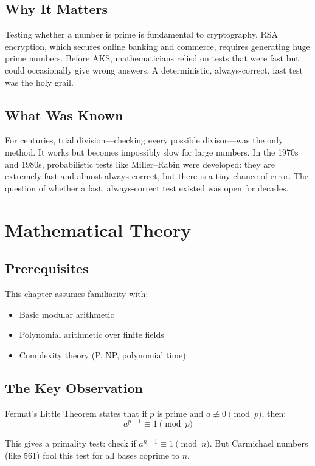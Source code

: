 \subsection{Why It Matters}
Testing whether a number is prime is fundamental to cryptography. RSA encryption, which secures online banking and commerce, requires generating huge prime numbers. Before AKS, mathematicians relied on tests that were fast but could occasionally give wrong answers. A deterministic, always-correct, fast test was the holy grail.

\subsection{What Was Known}
For centuries, trial division---checking every possible divisor---was the only method. It works but becomes impossibly slow for large numbers. In the 1970s and 1980s, probabilistic tests like Miller--Rabin were developed: they are extremely fast and almost always correct, but there is a tiny chance of error. The question of whether a fast, always-correct test existed was open for decades.

\section{Mathematical Theory}


\subsection{Prerequisites}
This chapter assumes familiarity with:
\begin{itemize}
\item Basic modular arithmetic
\item Polynomial arithmetic over finite fields
\item Complexity theory (P, NP, polynomial time)
\end{itemize}

\subsection{The Key Observation}

Fermat's Little Theorem states that if $p$ is prime and $a \not\equiv 0 \pmod{p}$, then:
\begin{equation}
a^{p-1} \equiv 1 \pmod{p}
\end{equation}

This gives a primality test: check if $a^{n-1} \equiv 1 \pmod{n}$. But Carmichael numbers (like 561) fool this test for all bases coprime to $n$.

